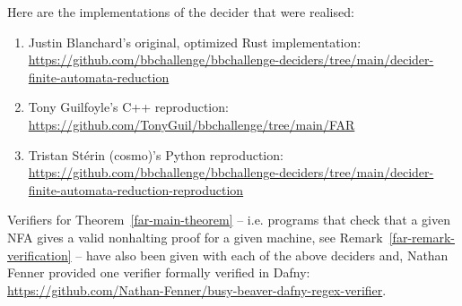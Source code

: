 Here are the implementations of the decider that were realised:

\begin{enumerate}
  \item Justin Blanchard's original, optimized Rust implementation: \url{https://github.com/bbchallenge/bbchallenge-deciders/tree/main/decider-finite-automata-reduction}
  \item Tony Guilfoyle's C++ reproduction: \url{https://github.com/TonyGuil/bbchallenge/tree/main/FAR}
  \item Tristan Stérin (cosmo)'s Python reproduction: \url{https://github.com/bbchallenge/bbchallenge-deciders/tree/main/decider-finite-automata-reduction-reproduction}
\end{enumerate}


Verifiers for Theorem~\ref{far-main-theorem} -- i.e. programs that check that a given NFA gives a valid nonhalting proof for a given machine, see Remark~\ref{far-remark-verification} -- have also been given with each of the above deciders and, Nathan Fenner provided one verifier formally verified in Dafny: \url{https://github.com/Nathan-Fenner/busy-beaver-dafny-regex-verifier}.


